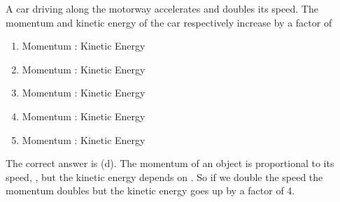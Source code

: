 
\begin{problem}[Robin1]
{A car driving along the motorway accelerates and doubles its speed. The momentum and kinetic energy of the car respectively increase by a factor of
\begin{enumerate}
	\item Momentum  \quad : \quad Kinetic Energy 
	\item Momentum  \quad : \quad Kinetic Energy  
	\item Momentum  \quad : \quad Kinetic Energy 
	\item Momentum  \quad : \quad Kinetic Energy  \answer
	\item Momentum  \quad : \quad Kinetic Energy 
\end{enumerate}
}
{}
{The correct answer is (d).  The momentum of an object is proportional to its speed, , but the kinetic energy depends on .  So if we double the speed the momentum doubles but the kinetic energy goes up by a factor of 4.}
\end{problem}